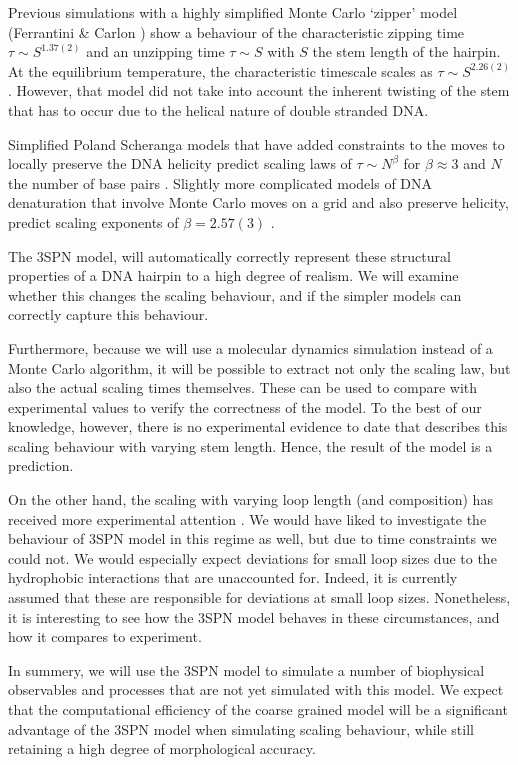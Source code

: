 Previous simulations with a highly simplified Monte Carlo `zipper' model (Ferrantini \& Carlon \cite{carlon2011anomalous}) show a behaviour of the characteristic zipping time $\tau \sim S^{1.37(2)}$ and an unzipping time $\tau \sim S$ with $S$ the stem length of the hairpin. At the equilibrium temperature, the characteristic timescale scales as $\tau \sim S^{2.26(2)}$ \cite{walter2011fractional}. However, that model did not take into account the inherent twisting of the stem that has to occur due to the helical nature of double stranded DNA.

Simplified Poland Scheranga models that have added constraints to the moves to locally preserve the DNA helicity predict scaling laws of $\tau \sim N^{\beta}$ for $\beta \approx 3$ and $N$ the number of base pairs \cite{baiesi2009multiple}.
Slightly more complicated models of DNA denaturation that involve Monte Carlo moves on a grid and also preserve helicity, predict scaling exponents of $\beta = 2.57(3)$  \cite{carlon2010unwinding}.

The 3SPN model, will automatically correctly represent these structural properties of a DNA hairpin to a high degree of realism. We will examine whether this changes the scaling behaviour, and if the simpler models can correctly capture this behaviour.

Furthermore, because we will use a molecular dynamics simulation instead of a Monte Carlo algorithm, it will be possible to extract not only the scaling law, but also the actual scaling times themselves. These can be used to compare with experimental values to verify the correctness of the model. To the best of our knowledge, however, there is no experimental evidence to date that describes this scaling behaviour with varying stem length. Hence, the result of the model is a prediction.

On the other hand, the scaling with varying loop length (and composition) has received more experimental attention \cite{bonnet1998kinetics}. We would have liked to investigate the behaviour of 3SPN model in this regime as well, but due to time constraints we could not. We would especially expect deviations for small loop sizes due to the hydrophobic interactions that are unaccounted for. Indeed, it is currently assumed \cite{kuznetsov2001semiflexible, vallone1999melting, shen2001loop} that these are responsible for deviations at small loop sizes. Nonetheless, it is interesting to see how the 3SPN model behaves in these circumstances, and how it compares to experiment.

In summery, we will use the 3SPN model to simulate a number of biophysical observables and processes that are not yet simulated with this model. We expect that the computational efficiency of the coarse grained model will be a significant advantage of the 3SPN model when simulating scaling behaviour, while still retaining a high degree of morphological accuracy.
